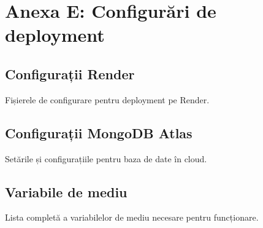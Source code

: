 \documentclass[12pt,a4paper]{report}
\begin{document}
\section*{Anexa E: Configurări de deployment}

\subsection*{Configurații Render}

Fișierele de configurare pentru deployment pe Render.

\subsection*{Configurații MongoDB Atlas}

Setările și configurațiile pentru baza de date în cloud.

\subsection*{Variabile de mediu}

Lista completă a variabilelor de mediu necesare pentru funcționare.
\end{document}
